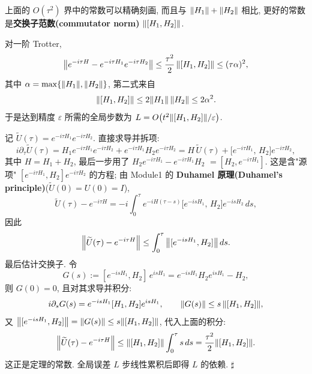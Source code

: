 \documentclass[utf8]{article} %
\numberwithin{equation}{section}   %
\newtheorem{Thm}{\hskip 2em {\color{blue} 定理}}[subsection]
\newenvironment{Proof}[1][\relax]{{\noindent\it Proof\ifx\relax#1\relax\else\ (#1)\fi:}\quad}{\hfill $\sharp$\par}
\begin{document}
上面的 $O(\tau^2)$ 界中的常数可以精确刻画, 而且与 $\norm{H_1}+\norm{H_2}$ 相比, 
更好的常数是\textbf{交换子范数(commutator norm)} $\norm{[H_1, H_2]}$.

\begin{Thm}[交换子型误差界]
    对一阶 Trotter,
    \begin{equation}
        \norm{e^{-i\tau H} - e^{-i\tau H_1} e^{-i\tau H_2}}
        \le \frac{\tau^2}{2}\,\norm{[H_1, H_2]} \le (\tau \alpha)^2,
    \end{equation}
    其中 $\alpha = \max\{\norm{H_1}, \norm{H_2}\}$, 第二式来自
    \begin{equation}
        \norm{[H_1,H_2]} \le 2\norm{H_1}\,\norm{H_2} \le 2\alpha^2.
    \end{equation}
    于是达到精度 $\varepsilon$ 所需的全局步数为
    $L = O\big(t^2\norm{[H_1,H_2]}/\varepsilon\big)$.
\end{Thm}

\begin{Proof}
    记 $\widetilde U(\tau) = e^{-i\tau H_1}e^{-i\tau H_2}$. 直接求导并拆项:
    \begin{equation}
        i\partial_\tau \widetilde U(\tau)
        = H_1 e^{-i\tau H_1}e^{-i\tau H_2} + e^{-i\tau H_1}H_2 e^{-i\tau H_2}
        = H\,\widetilde U(\tau) + \big[e^{-i\tau H_1},\, H_2\big]e^{-i\tau H_2},
    \end{equation}
    其中 $H = H_1 + H_2$, 最后一步用了 $H_2e^{-i\tau H_1} - e^{-i\tau H_1}H_2$
    $= [H_2, e^{-i\tau H_1}]$. 这是含"源项" $[e^{-i\tau H_1},H_2]e^{-i\tau H_2}$ 的方程;
    由 Module1 的 \textbf{Duhamel 原理(Duhamel's principle)}($\widetilde U(0) = U(0) = I$),
    \begin{equation}
        \widetilde U(\tau) - e^{-i\tau H}
        = -i\int_0^{\tau} e^{-iH(\tau-s)}\big[e^{-isH_1},\, H_2\big]e^{-isH_2}\,ds,
    \end{equation}
    因此
    \begin{equation}
        \norm{\widetilde U(\tau) - e^{-i\tau H}}
        \le \int_0^{\tau}\norm{[e^{-isH_1}, H_2]}\,ds.
    \end{equation}
    最后估计交换子. 令
    \begin{equation}
        G(s) := [e^{-isH_1}, H_2]\,e^{isH_1}
        = e^{-isH_1}H_2 e^{isH_1} - H_2,
    \end{equation}
    则 $G(0) = 0$, 且对其求导并积分:
    \begin{equation}
        i\partial_s G(s) = e^{-isH_1}[H_1, H_2]e^{isH_1}, \qquad
        \norm{G(s)} \le s\,\norm{[H_1, H_2]},
    \end{equation}
    又 $\norm{[e^{-isH_1}, H_2]} = \norm{G(s)} \le s\norm{[H_1,H_2]}$, 代入上面的积分:
    \[ \norm{\widetilde U(\tau) - e^{-i\tau H}}
       \le \norm{[H_1,H_2]}\int_0^{\tau} s\,ds = \frac{\tau^2}{2}\norm{[H_1,H_2]}. \]
    这正是定理的常数. 全局误差 $L$ 步线性累积后即得 $L$ 的依赖.
\end{Proof}
\end{document}
